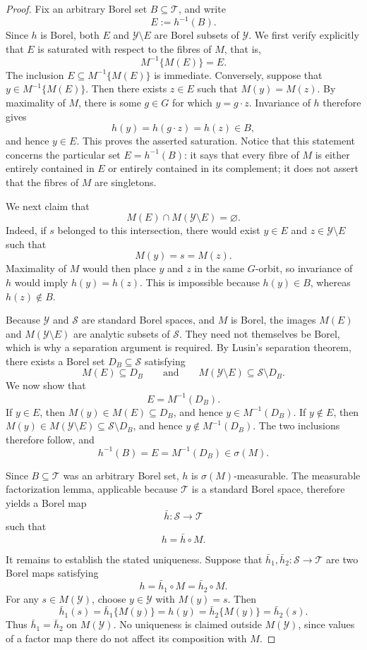 \documentclass[11pt]{article}
\theoremstyle{plain}
\theoremstyle{definition}
\numberwithin{equation}{section}
\newcommand{\1}{\mathbf 1}
\newcommand{\calS}{\mathcal S}
\newcommand{\calT}{\mathcal T}
\newcommand{\calY}{\mathcal Y}
\begin{document}
\begin{proof}
	Fix an arbitrary Borel set \(B\subseteq\calT\), and write
	\[
	E:=h^{-1}(B).
	\]
	Since \(h\) is Borel, both \(E\) and \(\calY\setminus E\) are Borel subsets of
	\(\calY\). We first verify explicitly that \(E\) is saturated with respect to
	the fibres of \(M\), that is,
	\[
	M^{-1}\{M(E)\}=E.
	\]
	The inclusion \(E\subseteq M^{-1}\{M(E)\}\) is immediate. Conversely, suppose
	that \(y\in M^{-1}\{M(E)\}\). Then there exists \(z\in E\) such that
	\(M(y)=M(z)\). By maximality of \(M\), there is some \(g\in G\) for which
	\(y=g\cdot z\). Invariance of \(h\) therefore gives
	\[
	h(y)=h(g\cdot z)=h(z)\in B,
	\]
	and hence \(y\in E\). This proves the asserted saturation. Notice that this
	statement concerns the particular set \(E=h^{-1}(B)\): it says that every
	fibre of \(M\) is either entirely contained in \(E\) or entirely contained in
	its complement; it does not assert that the fibres of \(M\) are singletons.
	
	We next claim that
	\[
	M(E)\cap M(\calY\setminus E)=\varnothing.
	\]
	Indeed, if \(s\) belonged to this intersection, there would exist
	\(y\in E\) and \(z\in\calY\setminus E\) such that
	\[
	M(y)=s=M(z).
	\]
	Maximality of \(M\) would then place \(y\) and \(z\) in the same \(G\)-orbit,
	so invariance of \(h\) would imply \(h(y)=h(z)\). This is impossible because
	\(h(y)\in B\), whereas \(h(z)\notin B\).
	
	Because \(\calY\) and \(\calS\) are standard Borel spaces, and \(M\) is
	Borel, the images \(M(E)\) and \(M(\calY\setminus E)\) are analytic subsets
	of \(\calS\). They need not themselves be Borel, which is why a separation
	argument is required. By Lusin's separation theorem, there exists a Borel
	set \(D_B\subseteq\calS\) satisfying
	\[
	M(E)\subseteq D_B
	\qquad\text{and}\qquad
	M(\calY\setminus E)\subseteq\calS\setminus D_B.
	\]
	We now show that
	\[
	E=M^{-1}(D_B).
	\]
	If \(y\in E\), then \(M(y)\in M(E)\subseteq D_B\), and hence
	\(y\in M^{-1}(D_B)\). If \(y\notin E\), then
	\(M(y)\in M(\calY\setminus E)\subseteq\calS\setminus D_B\), and hence
	\(y\notin M^{-1}(D_B)\). The two inclusions therefore follow, and
	\[
	h^{-1}(B)=E=M^{-1}(D_B)\in\sigma(M).
	\]
	
	Since \(B\subseteq\calT\) was an arbitrary Borel set, \(h\) is
	\(\sigma(M)\)-measurable. The measurable factorization lemma, applicable
	because \(\calT\) is a standard Borel space, therefore yields a Borel map
	\[
	\bar h:\calS\longrightarrow\calT
	\]
	such that
	\[
	h=\bar h\circ M.
	\]
	
	It remains to establish the stated uniqueness. Suppose that
	\(\bar h_1,\bar h_2:\calS\to\calT\) are two Borel maps satisfying
	\[
	h=\bar h_1\circ M=\bar h_2\circ M.
	\]
	For any \(s\in M(\calY)\), choose \(y\in\calY\) with \(M(y)=s\). Then
	\[
	\bar h_1(s)
	=\bar h_1\{M(y)\}
	=h(y)
	=\bar h_2\{M(y)\}
	=\bar h_2(s).
	\]
	Thus \(\bar h_1=\bar h_2\) on \(M(\calY)\). No uniqueness is claimed outside
	\(M(\calY)\), since values of a factor map there do not affect its
	composition with \(M\).
\end{proof}
\end{document}
